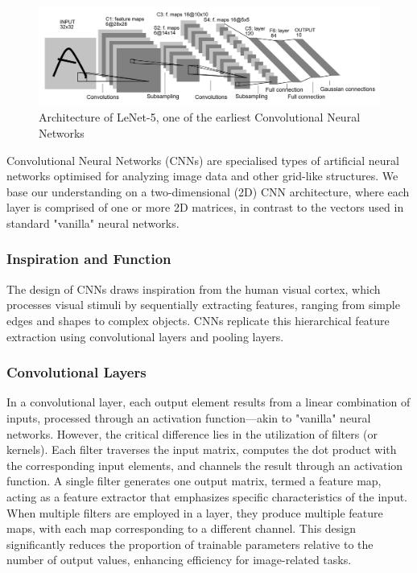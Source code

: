 \documentclass[12pt]{article}
\begin{document}
\begin{figure}[ht]
    \includegraphics[width=1\linewidth]{Le-Net 5.png}
    
    \caption{Architecture of LeNet-5, one of the earliest Convolutional Neural Networks \cite{726791}} 
    \label{fig:enter-label}
\end{figure}

Convolutional Neural Networks (CNNs) are specialised types of artificial neural networks optimised for analyzing image data and other grid-like structures. We base our understanding on a two-dimensional (2D) CNN architecture, where each layer is comprised of one or more 2D matrices, in contrast to the vectors used in standard "vanilla" neural networks.

\subsubsection*{Inspiration and Function}

The design of CNNs draws inspiration from the human visual cortex, which processes visual stimuli by sequentially extracting features, ranging from simple edges and shapes to complex objects. CNNs replicate this hierarchical feature extraction using convolutional layers and pooling layers. 

\subsubsection*{Convolutional Layers}

In a convolutional layer, each output element results from a linear combination of inputs, processed through an activation function—akin to "vanilla" neural networks. However, the critical difference lies in the utilization of filters (or kernels). Each filter traverses the input matrix, computes the dot product with the corresponding input elements, and channels the result through an activation function. 
A single filter generates one output matrix, termed a feature map, acting as a feature extractor that emphasizes specific characteristics of the input. 
When multiple filters are employed in a layer, they produce multiple feature maps, with each map corresponding to a different channel. 
This design significantly reduces the proportion of trainable parameters relative to the number of output values, enhancing efficiency for image-related tasks.
\end{document}
